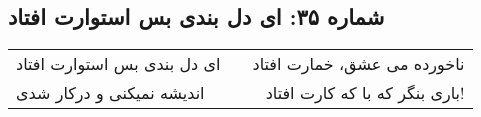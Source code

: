 \begin{center}
\section*{شماره ۳۵: ای دل بندی بس استوارت افتاد}
\label{sec:035}
\begin{longtable}{l p{0.5cm} r}
ای دل بندی بس استوارت افتاد
&&
ناخورده می عشق، خمارت افتاد
\\
اندیشه نمیکنی و درکار شدی
&&
باری بنگر که با که کارت افتاد!
\\
\end{longtable}
\end{center}

